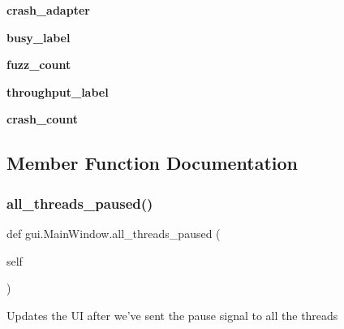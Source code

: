 \begin{DoxyCompactItemize}
{\bfseries crash\+\_\+adapter}
\item 
\mbox{\label{classgui_1_1_main_window_a593de2e5b6f2183091d649969d728a1c}} 
{\bfseries busy\+\_\+label}
\item 
\mbox{\label{classgui_1_1_main_window_a0de282b8540174bf79c015ca09c1b951}} 
{\bfseries fuzz\+\_\+count}
\item 
\mbox{\label{classgui_1_1_main_window_ae6c11a9b14a78c53913c019d321fb421}} 
{\bfseries throughput\+\_\+label}
\item 
\mbox{\label{classgui_1_1_main_window_a2a22ea657ff609de032b3a3b1a9d40cd}} 
{\bfseries crash\+\_\+count}
\end{DoxyCompactItemize}


\subsection{Member Function Documentation}
\mbox{\label{classgui_1_1_main_window_a9f26239fc8bef6253e4e08e16dd4d69b}} 
\subsubsection{\texorpdfstring{all\+\_\+threads\+\_\+paused()}{all\_threads\_paused()}}
{\footnotesize\ttfamily def gui.\+Main\+Window.\+all\+\_\+threads\+\_\+paused (\begin{DoxyParamCaption}\item[{}]{self }\end{DoxyParamCaption})}

\begin{DoxyVerb}Updates the UI after we've sent the pause signal to all the threads\end{DoxyVerb}
 \mbox{\label{classgui_1_1_main_window_a006abf132b0e9d55dbc3022d852ae856}} 
